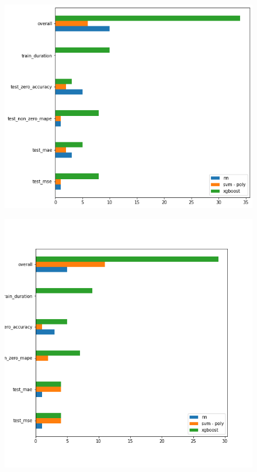 \begin{figure}
\begin{minipage}{.5\textwidth}
        \label{fig:non_zero_mape_availability}
    \end{minipage}
\end{figure}




\begin{figure}
    \centering
    \begin{minipage}{.4\textwidth}
        \centering
        \includegraphics[width=\linewidth]{figures/predictive_analysis/demand_benchmark.png}
        \label{fig:prediction_models_benchmark_demand}
    \end{minipage}%
    \begin{minipage}{.4\textwidth}
        \centering
        \includegraphics[width=\linewidth]{figures/predictive_analysis/availability_benchmark.png}

\end{minipage}
\end{figure}
